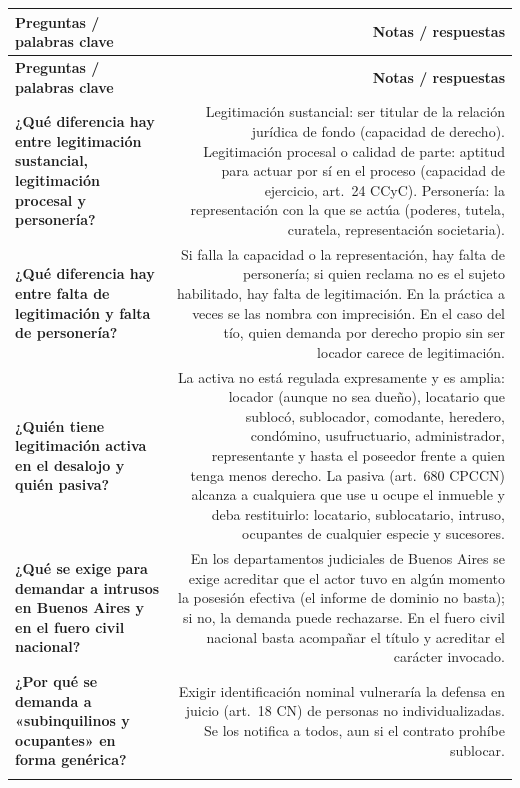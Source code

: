 \begin{longtable}{Q R}
\toprule
\textbf{Preguntas / palabras clave} & \textbf{Notas / respuestas} \\
\midrule
\endfirsthead
\toprule
\textbf{Preguntas / palabras clave} & \textbf{Notas / respuestas} \\
\midrule
\endhead

\textbf{¿Qué diferencia hay entre legitimación sustancial, legitimación procesal y personería?} &
Legitimación sustancial: ser titular de la relación jurídica de fondo (capacidad de derecho). Legitimación procesal o calidad de parte: aptitud para actuar por sí en el proceso (capacidad de ejercicio, art.\ 24 CCyC). Personería: la representación con la que se actúa (poderes, tutela, curatela, representación societaria). \\
\addlinespace[0.6em]

\textbf{¿Qué diferencia hay entre falta de legitimación y falta de personería?} &
Si falla la capacidad o la representación, hay falta de personería; si quien reclama no es el sujeto habilitado, hay falta de legitimación. En la práctica a veces se las nombra con imprecisión. En el caso del tío, quien demanda por derecho propio sin ser locador carece de legitimación. \\
\addlinespace[0.6em]

\textbf{¿Quién tiene legitimación activa en el desalojo y quién pasiva?} &
La activa no está regulada expresamente y es amplia: locador (aunque no sea dueño), locatario que sublocó, sublocador, comodante, heredero, condómino, usufructuario, administrador, representante y hasta el poseedor frente a quien tenga menos derecho. La pasiva (art.\ 680 CPCCN) alcanza a cualquiera que use u ocupe el inmueble y deba restituirlo: locatario, sublocatario, intruso, ocupantes de cualquier especie y sucesores. \\
\addlinespace[0.6em]

\textbf{¿Qué se exige para demandar a intrusos en Buenos Aires y en el fuero civil nacional?} &
En los departamentos judiciales de Buenos Aires se exige acreditar que el actor tuvo en algún momento la posesión efectiva (el informe de dominio no basta); si no, la demanda puede rechazarse. En el fuero civil nacional basta acompañar el título y acreditar el carácter invocado. \\
\addlinespace[0.6em]

\textbf{¿Por qué se demanda a «subinquilinos y ocupantes» en forma genérica?} &
Exigir identificación nominal vulneraría la defensa en juicio (art.\ 18 CN) de personas no individualizadas. Se los notifica a todos, aun si el contrato prohíbe sublocar. \\
\addlinespace[0.6em]


\end{longtable}
